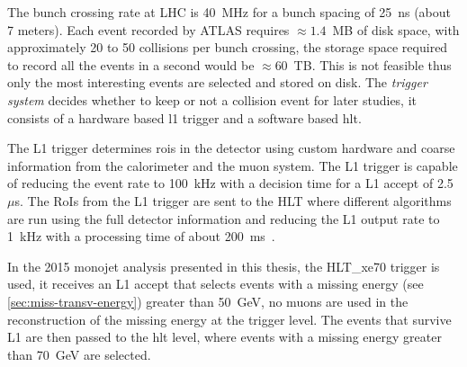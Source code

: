 The bunch crossing rate at LHC is 40~MHz for a bunch spacing of 25~ns (about 7
meters). Each event recorded by ATLAS requires $\approx 1.4$~MB of disk space,
with approximately 20 to 50 collisions per bunch crossing, the storage space
required to record all the events in a second would be $\approx 60$~TB. This is
not feasible thus only the most interesting events are selected and stored on
disk. The \emph{trigger system} decides whether to keep or not a collision event
for later studies, it consists of a hardware based \gls{l1} trigger and a
software based \gls{hlt}.

The L1 trigger determines \gls{rois} in the detector using custom hardware and
coarse information from the calorimeter and the muon system. The L1 trigger is
capable of reducing the event rate to 100~kHz with a decision time for a L1
accept of 2.5~$\mu$s. The RoIs from the L1 trigger are sent to the HLT where
different algorithms are run using the full detector information and reducing
the L1 output rate to 1~kHz with a processing time of about
200~ms~\cite{trigger}. %

In the 2015 monojet analysis presented in this thesis, the HLT\_xe70 trigger is
used, it receives an L1 accept that selects events with a missing energy (see
\cref{sec:miss-transv-energy}) greater than 50~GeV, no muons are used in the
reconstruction of the missing energy at the trigger level. The events that
survive L1 are then passed to the \gls{hlt} level, where events with a missing
energy greater than 70~GeV are selected.

